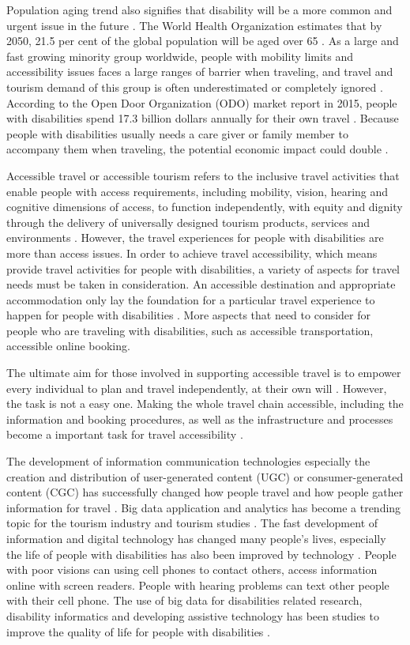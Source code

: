 Population aging trend also signifies that disability will be a more common
and urgent issue in the future \cite{Grue}. The World Health Organization estimates that
by 2050, 21.5 per cent of the global population will be aged over 65 \cite{Ama}. As a large
and fast growing minority group worldwide, people with mobility limits and accessibility 
issues faces a large ranges of barrier when traveling, and travel and tourism demand of 
this group is often underestimated or completely ignored \cite{Ama}. According to the
Open Door Organization (ODO) market report in 2015, people with disabilities spend 17.3
billion dollars annually for their own travel \cite{ODO}. Because people with disabilities
usually needs a care giver or family member to accompany them when traveling, the potential
economic impact could double \cite{ODO}. 


Accessible travel or accessible tourism refers to the inclusive travel activities that
enable people with access requirements, including mobility, vision, hearing and cognitive
dimensions of access, to function independently, with equity and dignity through the
delivery of universally designed tourism products, services and environments \cite{Ama}.
However, the travel experiences for people with disabilities are more than access
issues. In order to achieve travel accessibility, which means provide travel activities
for people with disabilities, a variety of aspects for travel needs must be taken in
consideration. An accessible destination and appropriate accommodation only lay the 
foundation for a particular travel experience to happen for people with 
disabilities \cite{ODO}. More aspects that need to
consider for people who are traveling with disabilities, such as accessible
transportation, accessible online booking\cite{Ama}.

The ultimate aim for those involved in supporting accessible travel is to empower every
individual to plan and travel independently, at their own will \cite{zhang2016}. However,
the task is not a easy one. Making the whole travel chain accessible, including the
information and booking procedures, as well as the infrastructure and processes become a
important task for travel accessibility \cite{Ama}. 

The development of information communication technologies especially the creation
and distribution of user-generated content (UGC) or consumer-generated content (CGC) has
successfully changed how people travel and how people gather information for travel
\cite{chung2009}. Big data application and analytics has become a trending topic for
the tourism industry and tourism studies \cite{chung2009}. The fast development of 
information and digital technology has changed many people's
lives, especially the life of people with disabilities has also been improved by
technology \cite{GJT14}. People with poor visions can using cell phones to contact
others, access information online with screen readers. People with hearing problems can
text other people with their cell phone. The use of big data for disabilities related
research, disability informatics and developing assistive technology has been studies
to improve the quality of life for people with disabilities \cite{Grue}. 


